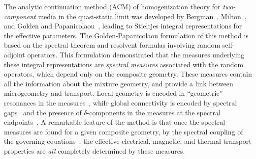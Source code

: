 \documentclass{cmslatex}
\begin{document}
The analytic continuation method (ACM) of homogenization theory
for \emph{two-component} media in the
quasi-static limit was developed by Bergman~\cite{Bergman:PRL-1285},
Milton~\cite{Milton:APL-300}, and Golden and
Papanicolaou~\cite{Golden:CMP-473}, 
leading to Stieltjes integral representations for the effective
parameters.  The Golden-Papanicolaou formulation of this
method is based on the spectral theorem
and resolvent formulas involving random self-adjoint operators. This
formulation demonstrated that the measures underlying 
these integral representations are \emph{spectral measures} associated
with the random operators, which depend only on the composite
geometry. These measures contain all the information about the mixture
geometry, and provide a link between microgeometry and
transport. Local geometry is encoded in ``geometric'' resonances in
the measures~\cite{Jonckheere_Luck_JPA_1998}, while global
connectivity is encoded by spectral
gaps~\cite{Murphy:JMP:063506,Jonckheere_Luck_JPA_1998} and the
presence of $\delta$-components in the measures at the spectral
endpoints~\cite{Murphy:JMP:063506}. A remarkable  
feature of the method is that once the spectral measures are found for
a given composite geometry, by the spectral coupling of the governing
equations~\cite{Cherkaev:IP-1203,MILTON:2002:TC,Cherkaev:2004:331,Cherkaev:PBCM:0921}, 
the effective electrical, magnetic, and thermal transport properties
are \emph{all} completely determined by these measures.
\end{document}

